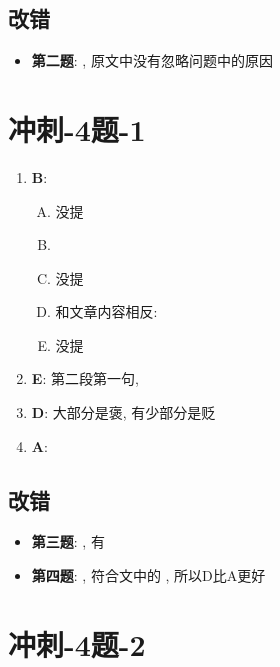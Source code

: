   \subsection{改错}

    \begin{itemize}
      \item \textbf{第二题}: , 原文中没有忽略问题中的原因
    \end{itemize}

\section{冲刺-4题-1}

  \begin{enumerate}
    \item \textbf{B}:
    \begin{enumerate}[A.]
      \item 没提
      \item %
      \item 没提
      \item 和文章内容相反: 
      \item 没提
    \end{enumerate}

    \item \textbf{E}: 第二段第一句, 
    \item \textbf{D}: 大部分是褒, 有少部分是贬
    \item \textbf{A}: 
  \end{enumerate}

  \subsection{改错}

    \begin{itemize}
      \item \textbf{第三题}: , 有
      \item \textbf{第四题}: , 符合文中的
      , 所以D比A更好
    \end{itemize}

\section{冲刺-4题-2}

